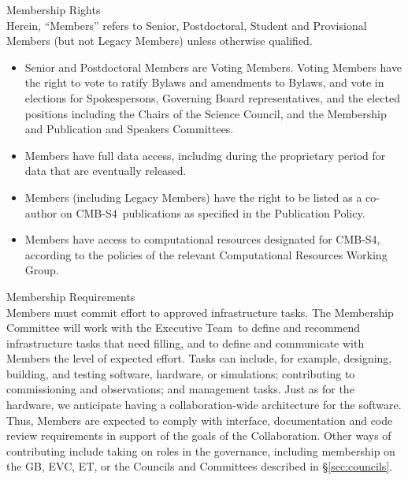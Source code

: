 \documentclass[12pt]{article}
\newcommand{\exec}{{Executive Team}}
\newcommand\collabname{CMB-S4}
\begin{document}
{{\begin{itemize}
\end{itemize}

{\large {} Membership Rights}\\

Herein, ``Members'' refers to Senior, Postdoctoral, Student and Provisional Members (but not Legacy Members) unless otherwise qualified.  

\begin{itemize}

\item Senior and Postdoctoral Members are Voting Members.  Voting Members  have the right to vote to ratify Bylaws and amendments to Bylaws, and vote in elections for Spokespersons, Governing Board representatives, and the elected positions including the Chairs of the Science Council, and the Membership and Publication and Speakers Committees.   

\item Members have full data access, including during the proprietary period for data that are eventually released.

\item Members (including Legacy Members) have the right to be listed as a co-author on \collabname\ publications as specified in the Publication Policy.

\item Members have access to computational resources designated for \collabname, according to the policies of the relevant Computational Resources Working Group.

\end{itemize}

{\large {} Membership Requirements}\\

Members must commit effort to approved infrastructure tasks. The Membership Committee will work with the \exec\ to define and recommend infrastructure tasks that need filling, and to define and communicate with Members the level of expected effort. Tasks can include,  for example, designing, building, and testing software, hardware, or simulations; contributing to commissioning and observations; and management tasks.  Just as for the hardware, we anticipate having a collaboration-wide architecture for the software.  Thus, Members are expected to comply with interface, documentation and code review requirements in support of the goals of the Collaboration.   Other ways of contributing include taking on roles in the governance, including membership on the GB, EVC, ET, or the Councils and Committees described in \S\ref{sec:councils}.\\

}}
\end{document}
